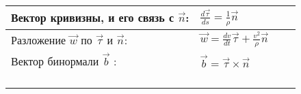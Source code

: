 \documentclass{article}
\begin{document}
\begin{tabular}{ |p{6cm}|p{3.5cm}|p{6cm}|p{3.5cm}|  }
                                                                             \\ %
\hline
Вектор кривизны, и его связь с $\vec{n}$:                                     &  %
$\frac{d\vec{\tau}}{ds} = \frac{1}{\rho} \vec{n}$                             &  %
                                                                             &  %
                                                                             \\ %
\hline
Разложение $\vec{w}$ по $\vec{\tau}$ и $\vec{n}$:                            &  %
$\vec{w} = \frac{dv}{dt} \vec{\tau} + \frac{v^2}{\rho} \vec{n}$              &  %
                                                                             &  %
                                                                             \\ %
\hline
Вектор бинормали $\vec{b}$ :                                                 &  %
$\vec{b} = \vec{\tau} \times \vec{n}$                                             &  %
                                                                             &  %
                                                                             \\ %
\hline
                                                                             &  %
                                                                             &  %
                                                                             &  %
                                                                             \\ %
\hline
                                                                             &  %
                                                                             &  %
                                                                             &  %
                                                                             \\ %
\hline
                                                                             &  %
                                                                             &  %
                                                                             &  %
                                                                             \\ %
\hline
                                                                             &  %

\end{tabular}
\end{document}
